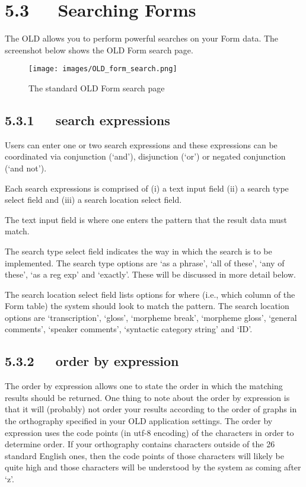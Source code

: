 \documentclass[letterpaper,10pt,english]{sphinxmanual}
\begin{document}
\section{5.3   Searching Forms}
\label{documentation:searching-forms}
The OLD allows you to perform powerful searches on your Form data.  The
screenshot below shows the OLD Form search page.
\begin{figure}[htbp]
\centering
\capstart

\texttt{[image: images/OLD\_form\_search.png]}
\caption{The standard OLD Form search page}\end{figure}


\subsection{5.3.1   search expressions}
\label{documentation:search-expressions}
Users can enter one or two search expressions and these expressions can be
coordinated via conjunction (`and'), disjunction (`or') or negated conjunction
(`and not').

Each search expressions is comprised of (i) a text input field (ii) a search
type select field and (iii) a search location select field.

The text input field is where one enters the pattern that the result data must
match.

The search type select field indicates the way in which the search is to
be implemented.  The search type options are `as a phrase', `all of these',
`any of these', `as a reg exp' and `exactly'.  These will be discussed in more
detail below.

The search location select field lists options for where (i.e., which column of
the Form table) the system should look to match the pattern.  The search
location options are `transcription', `gloss', `morpheme break', `morpheme
gloss', `general comments', `speaker comments', `syntactic category string' and
`ID'.


\subsection{5.3.2   order by expression}
\label{documentation:order-by-expression}
The order by expression allows one to state the order in which the matching
results should be returned.  One thing to note about the order by expression is
that it will (probably) not order your results according to the order of graphs
in the orthography specified in your OLD application settings.  The order by
expression uses the code points (in utf-8 encoding) of the characters in order
to determine order.  If your orthography contains characters outside of the 26
standard English ones, then the code points of those characters will likely be
quite high and those characters will be understood by the system as coming after
`z'.
\end{document}

